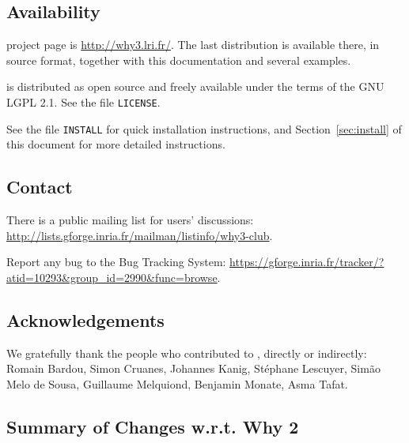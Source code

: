 \documentclass[a4paper,11pt,twoside,openright]{memoir}
\begin{document}
\subsection*{Availability}

\why project page is \url{http://why3.lri.fr/}.  The last distribution
is available there, in source format, together with this documentation
and several examples.

\why is distributed as open source and freely available under the
terms of the GNU LGPL 2.1. See the file \texttt{LICENSE}.

See the file \texttt{INSTALL} for quick installation instructions, and
Section~\ref{sec:install} of this document for more detailed
instructions.

\subsection*{Contact}

There is a public mailing list for users' discussions:
\url{http://lists.gforge.inria.fr/mailman/listinfo/why3-club}.

Report any bug to the \why Bug Tracking System:
\url{https://gforge.inria.fr/tracker/?atid=10293&group_id=2990&func=browse}.


\subsection*{Acknowledgements}

We gratefully thank the people who contributed to \why, directly or
indirectly: Romain Bardou, Simon Cruanes, Johannes Kanig, St\'ephane
Lescuyer, Sim\~ao Melo de Sousa, Guillaume Melquiond, Benjamin Monate,
Asma Tafat.

\subsection*{Summary of Changes w.r.t. Why 2}
\end{document}
